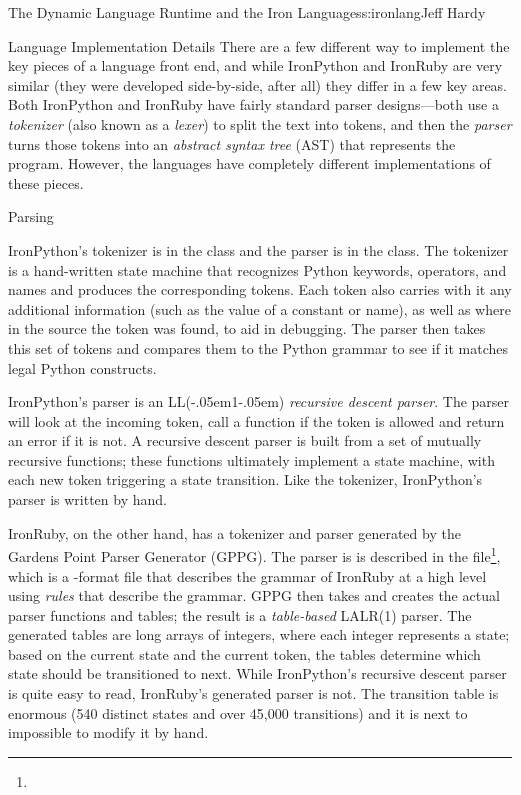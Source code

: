 \begin{aosachapter}{The Dynamic Language Runtime and the Iron Languages}{s:ironlang}{Jeff Hardy}
\begin{aosasect1}{Language Implementation Details}
There are a few different way to implement the key pieces of a language
front end, and while IronPython and IronRuby are very similar (they were
developed side-by-side, after all) they differ in a few key areas. Both
IronPython and IronRuby have fairly standard parser designs---both use a
\emph{tokenizer} (also known as a \emph{lexer}) to split the text into tokens,
and then the \emph{parser} turns those tokens into an \emph{abstract syntax
tree} (AST) that represents the program. However, the languages have completely
different implementations of these pieces.

\end{aosasect1}

\begin{aosasect1}{Parsing}

IronPython's tokenizer is in the  class and
the parser is in the  class. The tokenizer is
a hand-written state machine that recognizes Python keywords, operators, and
names and produces the corresponding tokens. Each token also carries with it
any additional information (such as the value of a constant or name), as well
as where in the source the token was found, to aid in debugging. The parser then
takes this set of tokens and compares them to the Python grammar to see if it
matches legal Python constructs.

IronPython's parser is an LL(\kern-.05em1\kern-.05em) \emph{recursive descent parser}. The parser
will look at the incoming token, call a function if the token is allowed and
return an error if it is not. A recursive descent parser is built from a set of
mutually recursive functions; these functions ultimately implement a state
machine, with each new token triggering a state transition. Like the tokenizer,
IronPython's parser is written by hand.

IronRuby, on the other hand, has a tokenizer and parser generated by the
Gardens Point Parser Generator (GPPG). The parser is is described in the
file\footnote{}, which is a
-format file that describes the grammar of IronRuby at a high level
using \emph{rules} that describe the grammar. GPPG then takes 
and creates the actual parser functions and tables; the result is a
\emph{table-based} LALR(1) parser. The generated tables are long arrays of
integers, where each integer represents a state; based on the current state and
the current token, the tables determine which state should be transitioned to
next. While IronPython's recursive descent parser is quite easy to read,
IronRuby's generated parser is not. The transition table is enormous (540
distinct states and over 45,000 transitions) and it is next to impossible to
modify it by hand.


\end{aosasect1}
\end{aosachapter}
